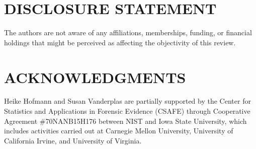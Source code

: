 \documentclass[letterpaper]{ar-1col}\usepackage[]{graphicx}\usepackage[]{color}
\begin{document}
%
%
%
%
%
%

\section*{DISCLOSURE STATEMENT}
The authors are not aware of any affiliations, memberships, funding, or financial holdings that
might be perceived as affecting the objectivity of this review.

\section*{ACKNOWLEDGMENTS}
Heike Hofmann and Susan Vanderplas are partially supported by the Center for Statistics and Applications in Forensic Evidence (CSAFE) through Cooperative Agreement \#70NANB15H176 between NIST and Iowa State University, which includes activities carried out at Carnegie Mellon University, University of California Irvine, and University of Virginia.
\clearpage

\end{document}
